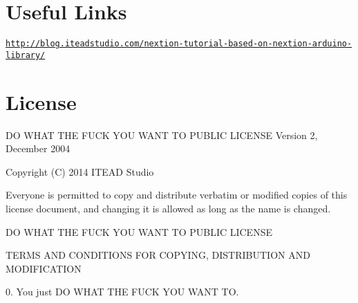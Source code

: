 \section*{Useful Links}

\href{http://blog.iteadstudio.com/nextion-tutorial-based-on-nextion-arduino-library/}{\tt http\+://blog.\+iteadstudio.\+com/nextion-\/tutorial-\/based-\/on-\/nextion-\/arduino-\/library/}

\section*{License}





\begin{DoxyVerb}DO WHAT THE FUCK YOU WANT TO PUBLIC LICENSE 
    Version 2, December 2004 

Copyright (C) 2014 ITEAD Studio

Everyone is permitted to copy and distribute verbatim or modified 
copies of this license document, and changing it is allowed as long 
as the name is changed. 

    DO WHAT THE FUCK YOU WANT TO PUBLIC LICENSE 

TERMS AND CONDITIONS FOR COPYING, DISTRIBUTION AND MODIFICATION 

0. You just DO WHAT THE FUCK YOU WANT TO.
\end{DoxyVerb}




 